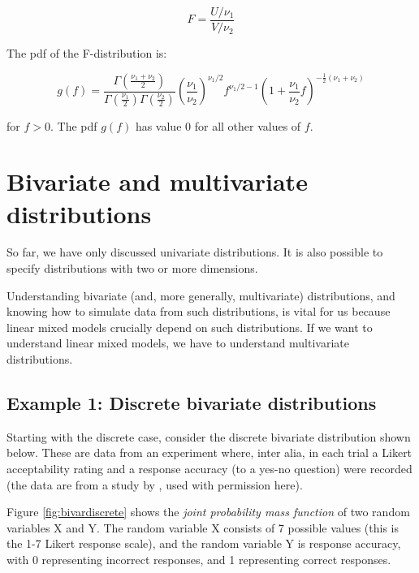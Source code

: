 \documentclass[
  12pt,
]{krantz}
\theoremstyle{definition}
\theoremstyle{definition}
\theoremstyle{definition}
\theoremstyle{definition}
\theoremstyle{remark}
\begin{document}
\begin{equation}
F = \frac{U/\nu_1}{V/\nu_2}
\end{equation}

The pdf of the F-distribution is:

\begin{equation}
g(f) = \frac{\Gamma(\frac{\nu_1 + \nu_2}{2})}{\Gamma(\frac{\nu_1}{2}) \Gamma(\frac{\nu_2}{2}) } \left(\frac{\nu_1}{\nu_2}\right)^{\nu_1/2} f^{\nu_1/2 -1 } (1 + \frac{\nu_1}{\nu_2}f)^{-\frac{1}{2}(\nu_1 + \nu_2)}
\end{equation}

for \(f>0\). The pdf \(g(f)\) has value \(0\) for all other values of \(f\).

\hypertarget{bivariate-and-multivariate-distributions}{%
\section{Bivariate and multivariate distributions}\label{bivariate-and-multivariate-distributions}}

So far, we have only discussed univariate distributions. It is also possible to specify distributions with two or more dimensions.

Understanding bivariate (and, more generally, multivariate) distributions, and knowing how to simulate data from such distributions, is vital for us because linear mixed models crucially depend on such distributions. If we want to understand linear mixed models, we have to understand multivariate distributions.

\hypertarget{example-1-discrete-bivariate-distributions}{%
\subsection{Example 1: Discrete bivariate distributions}\label{example-1-discrete-bivariate-distributions}}

Starting with the discrete case, consider the discrete bivariate distribution shown below. These are data from an experiment where, inter alia, in each trial a Likert acceptability rating and a response accuracy (to a yes-no question) were recorded (the data are from a study by \citet{AnnaLphd}, used with permission here).

Figure \ref{fig:bivardiscrete} shows the \emph{joint probability mass function} of two random variables X and Y. The random variable X consists of 7 possible values (this is the 1-7 Likert response scale), and the random variable Y is response accuracy, with 0 representing incorrect responses, and 1 representing correct responses.
\end{document}

